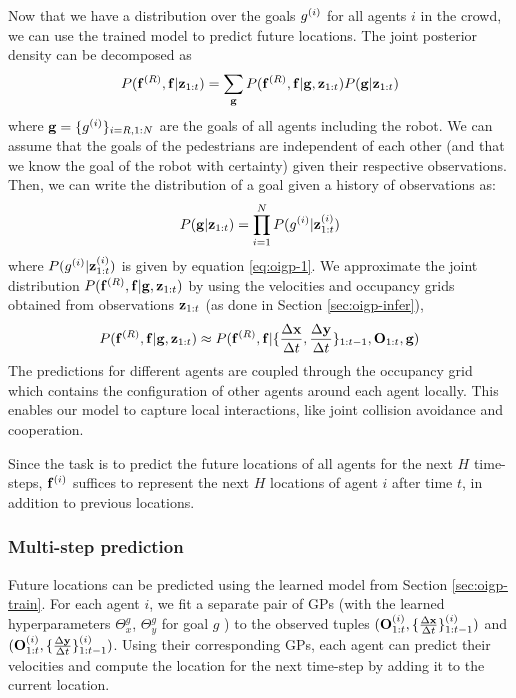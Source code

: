 Now that we have a distribution over the goals $g^{(i)}$ for all agents
$i$ in the crowd, we can use the trained model to predict future
locations. The joint posterior density can be decomposed as
\begin{equation}
  \label{eq:oigp-11}
  P(\mathbf{f}^{(R)}, \mathbf{f} | \mathbf{z}_{1:t}) = \sum_{\mathbf{g}} P(\mathbf{f}^{(R)}, \mathbf{f} | \mathbf{g}, \mathbf{z}_{1:t}) P(\mathbf{g} | \mathbf{z}_{1:t})
\end{equation}
where $\mathbf{g} = \{g^{(i)}\}_{i=R,1:N}$ are the goals of all agents
including the robot.
%
%
We can assume that the goals of the pedestrians are independent of
each other (and that we know the goal of the robot with certainty)
given their respective observations. Then, we can write the
distribution of a goal given a history of observations as:
\begin{equation}
  \label{eq:oigp-12}
  P(\mathbf{g}|\mathbf{z}_{1:t}) = \prod_{i=1}^{N} P(g^{(i)}|\mathbf{z}_{1:t}^{(i)})
\end{equation}
where $P(g^{(i)}|\mathbf{z}_{1:t}^{(i)})$ is given by equation \ref{eq:oigp-1}.
We approximate the joint distribution
$P(\mathbf{f}^{(R)}, \mathbf{f}|\mathbf{g}, \mathbf{z}_{1:t})$ by using the velocities
and occupancy grids obtained from observations $\mathbf{z}_{1:t}$ (as done
in Section \ref{sec:oigp-infer}),
\begin{equation}
  \label{eq:oigp-13}
  P(\mathbf{f}^{(R)}, \mathbf{f}|\mathbf{g}, \mathbf{z}_{1:t}) \approx P(\mathbf{f}^{(R)}, \mathbf{f}|\{\frac{\Delta \mathbf{x}}{\Delta t}, \frac{\Delta \mathbf{y}}{\Delta t}\}_{1:t-1}, \mathbf{O}_{1:t}, \mathbf{g})
\end{equation}
%
%
The predictions for different agents are coupled through the occupancy
grid which contains the configuration of other agents around each
agent locally.
%
%
%
%
This enables our model to capture local interactions, like joint
collision avoidance and cooperation.

Since the task is to predict the future locations of all agents for
the next $H$ time-steps, $\mathbf{f}^{(i)}$ suffices to represent the next
$H$ locations of agent $i$ after time $t$, in addition to previous
locations.

\subsubsection{Multi-step prediction}
\label{sec:oigp-sampling}
Future locations can be predicted using the learned model from Section
\ref{sec:oigp-train}. For each agent $i$, we fit a separate pair of GPs
(with the learned hyperparameters $\Theta_x^g$, $\Theta_y^g$ for goal
$g$
%
) to the observed tuples $(\mathbf{O}^{(i)}_{1:t}, \{\frac{\Delta \mathbf{x}}{\Delta t}\}_{1:t-1}^{(i)})$
and $(\mathbf{O}^{(i)}_{1:t}, \{\frac{\Delta \mathbf{y}}{\Delta t}\}_{1:t-1}^{(i)})$. Using their
corresponding GPs, each agent can predict their velocities and compute
the location for the next time-step by adding it to the current
location.

